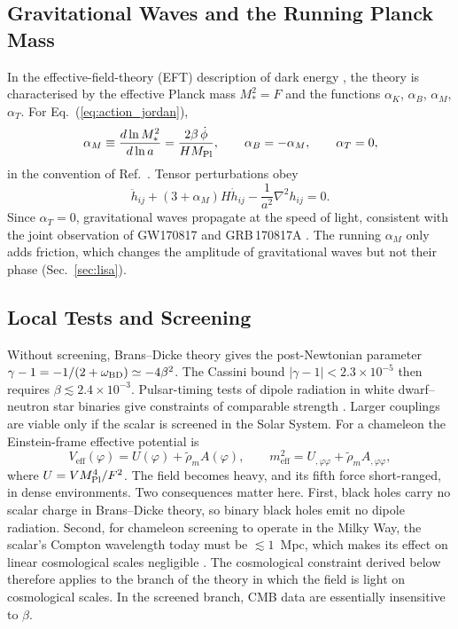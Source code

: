 \documentclass[11pt,a4paper]{article}
\begin{document}
\subsection{Gravitational Waves and the Running Planck Mass}
In the effective-field-theory (EFT) description of dark energy \cite{BelliniSawicki2014}, the theory is characterised by the effective Planck mass $M_*^2 = F$ and the functions $\alpha_K$, $\alpha_B$, $\alpha_M$, $\alpha_T$. For Eq.~(\ref{eq:action_jordan}),
\begin{equation}
\alpha_M \equiv \frac{d\ln M_*^2}{d\ln a} = \frac{2\beta\,\dot\phi}{H M_{\rm Pl}}, \qquad \alpha_B = -\alpha_M, \qquad \alpha_T = 0,
\label{eq:alpha_M_def}
\end{equation}
in the convention of Ref.~\cite{BelliniSawicki2014}. Tensor perturbations obey
\begin{equation}
\ddot{h}_{ij} + (3 + \alpha_M) H \dot{h}_{ij} - \frac{1}{a^2} \nabla^2 h_{ij} = 0 .
\label{eq:tensor_prop}
\end{equation}
Since $\alpha_T = 0$, gravitational waves propagate at the speed of light, consistent with the joint observation of GW170817 and GRB\,170817A \cite{Abbott2017GRB,Baker2017}. The running $\alpha_M$ only adds friction, which changes the amplitude of gravitational waves but not their phase (Sec.~\ref{sec:lisa}).

\subsection{Local Tests and Screening}
\label{sec:local}
Without screening, Brans--Dicke theory gives the post-Newtonian parameter $\gamma - 1 = -1/(2+\omega_{\rm BD}) \simeq -4\beta^2$. The Cassini bound $|\gamma - 1| < 2.3 \times 10^{-5}$ \cite{Bertotti2003} then requires $\beta \lesssim 2.4 \times 10^{-3}$. Pulsar-timing tests of dipole radiation in white dwarf--neutron star binaries give constraints of comparable strength \cite{Freire2012}. Larger couplings are viable only if the scalar is screened in the Solar System. For a chameleon \cite{Khoury2004} the Einstein-frame effective potential is
\begin{equation}
V_{\text{eff}}(\varphi) = U(\varphi) + \tilde\rho_m A(\varphi), \qquad m_{\text{eff}}^2 = U_{,\varphi\varphi} + \tilde\rho_m A_{,\varphi\varphi},
\end{equation}
where $U = V M_{\rm Pl}^4/F^2$. The field becomes heavy, and its fifth force short-ranged, in dense environments. Two consequences matter here. First, black holes carry no scalar charge in Brans--Dicke theory, so binary black holes emit no dipole radiation. Second, for chameleon screening to operate in the Milky Way, the scalar's Compton wavelength today must be $\lesssim 1$~Mpc, which makes its effect on linear cosmological scales negligible \cite{WangHuiKhoury2012}. The cosmological constraint derived below therefore applies to the branch of the theory in which the field is light on cosmological scales. In the screened branch, CMB data are essentially insensitive to $\beta$.
\end{document}
